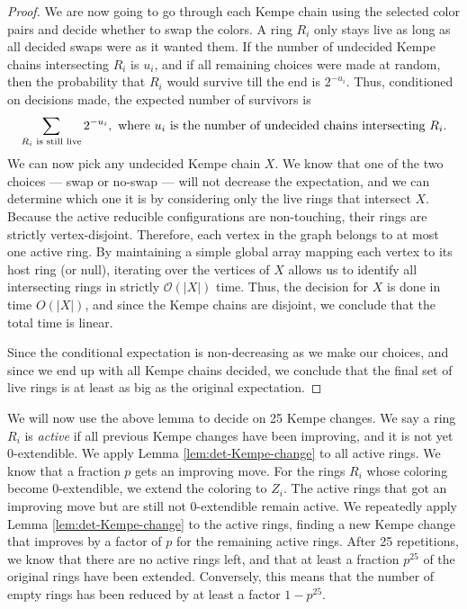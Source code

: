 \documentclass[10pt,a4paper]{article}
\begin{document}
\begin{proof}
We are now going to go through each Kempe chain using the selected color pairs and decide whether to swap the colors. A ring $R_i$ only stays live as long as all decided swaps were as it wanted them. If the number of undecided Kempe chains intersecting $R_i$ is $u_i$, and if all remaining choices were made at random, then the probability that $R_i$ would survive till the end is $2^{-u_i}$. Thus, conditioned on decisions made, the expected number of survivors is
\[\sum_{R_i\textnormal{ is still live}}2^{-u_i}, \textnormal{ where $u_i$ is
the number of  undecided chains intersecting } R_i.\]
We can now pick any undecided Kempe chain $X$. We know that one of the two choices — swap or no-swap — will not decrease the expectation, and we can determine which one it is by considering only the live rings that intersect $X$. 
Because the active reducible configurations are non-touching, their rings are strictly vertex-disjoint. Therefore, each vertex in the graph belongs to at most one active ring. By maintaining a simple global array mapping each vertex to its host ring (or null), iterating over the vertices of $X$ allows us to identify all intersecting rings in strictly $\mathcal{O}(|X|)$ time. 
Thus, the decision for $X$ is done in time $O(|X|)$, and since the Kempe chains are disjoint, we conclude that the total time is linear.

Since the conditional expectation is non-decreasing as we make our choices, and since we end up with all Kempe chains decided, we conclude that the final set of live rings is at least as big as the original expectation.
\end{proof}

We will now use the above lemma to decide on 25 Kempe changes. We say a ring $R_i$ is \emph{active} if all previous Kempe changes have been improving, and it is not yet 0-extendible. We apply Lemma \ref{lem:det-Kempe-change} to all active rings. We know that a fraction $p$ gets an improving move. For the rings $R_i$ whose coloring become 0-extendible, we extend the coloring to $Z_i$. The active rings that got an improving move but are still not 0-extendible remain active. We repeatedly apply Lemma \ref{lem:det-Kempe-change} to the active rings, finding a new Kempe change that improves by a factor of $p$ for the remaining active rings. After 25 repetitions, we know that there are no active rings left, and that at least a fraction $p^{25}$ of the original rings have been extended. Conversely, this means that the number of empty rings 
has been reduced by at least a factor $1-p^{25}$.
\end{document}
